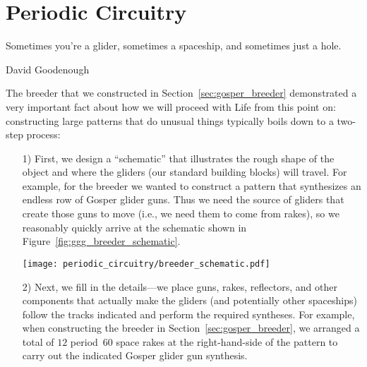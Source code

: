 
\renewcommand{\chapterfolder}{periodic_circuitry/}
\chapter{Periodic Circuitry}\label{chp:periodic_circuitry}


\vspace*{-0.4in}
\epigraph{Sometimes you're a glider, sometimes a spaceship, and sometimes just a hole.}{David Goodenough}
\vspace*{0.4in}


\noindent The breeder that we constructed in Section~\ref{sec:gosper_breeder} demonstrated a very important fact about how we will proceed with Life from this point on: constructing large patterns that do unusual things typically boils down to a two-step process:\smallskip

\begin{enumerate}
	\item[1)] First, we design a ``schematic'' that illustrates the rough shape of the object and where the gliders (our standard building blocks) will travel. For example, for the breeder we wanted to construct a pattern that synthesizes an endless row of Gosper glider guns. Thus we need the source of gliders that create those guns to move (i.e., we need them to come from rakes), so we reasonably quickly arrive at the schematic shown in Figure~\ref{fig:ggg_breeder_schematic}.\bigskip
	
	\noindent\begin{minipage}{\linewidth}
		\centering
		\texttt{[image: periodic\_circuitry/breeder\_schematic.pdf]}
		\label{fig:ggg_breeder_schematic}\bigskip
	\end{minipage}
	
	\item[2)] Next, we fill in the details---we place guns, rakes, reflectors, and other components that actually make the gliders (and potentially other spaceships) follow the tracks indicated and perform the required syntheses. For example, when constructing the breeder in Section~\ref{sec:gosper_breeder}, we arranged a total of $12$ period~$60$ space rakes at the right-hand-side of the pattern to carry out the indicated Gosper glider gun synthesis.\smallskip
\end{enumerate}

